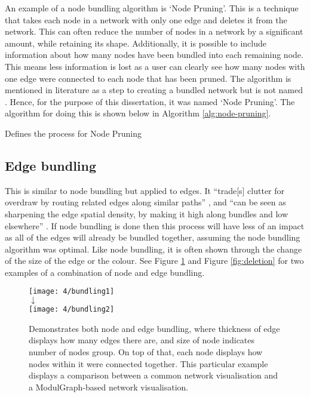 \documentclass[../dissertation.tex]{subfiles}
\begin{document}
An example of a node bundling algorithm is `Node Pruning'. This is a technique that takes each node in a network with only one edge and deletes it from the network. This can often reduce the number of nodes in a network by a significant amount, while retaining its shape. Additionally, it is possible to include information about how many nodes have been bundled into each remaining node. This means less information is lost as a user can clearly see how many nodes with one edge were connected to each node that has been pruned. The algorithm is mentioned in literature as a step to creating a bundled network but is not named \cite{brandes2003experiments}. Hence, for the purpose of this dissertation, it was named `Node Pruning'. The algorithm for doing this is shown below in Algorithm \ref{alg:node-pruning}.

\begin{algorithm}
\caption{Defines the process for Node Pruning}
\label{alg:node-pruning}
\begin{algorithmic}
 
   \ENDIF \ENDFOR
{}  \ENDFOR
\end{algorithmic}
\end{algorithm}

\subsection{Edge bundling}
\label{sec:edge_bundling}

This is similar to node bundling but applied to edges. It ``trade[s] clutter for overdraw by routing related edges along similar paths'' \cite{hurter2012graph}, and ``can be seen as sharpening the edge spatial density, by making it high along bundles and low elsewhere'' \cite{hurter2012graph}. If node bundling is done then this process will have less of an impact as all of the edges will already be bundled together, assuming the node bundling algorithm was optimal. Like node bundling, it is often shown through the change of the size of the edge or the colour. See Figure \ref{fig:bundling} and Figure \ref{fig:deletion} for two examples of a combination of node and edge bundling.
\begin{figure}
    \centering
    \texttt{[image: 4/bundling1]}
    \\$\downarrow$\\
    \texttt{[image: 4/bundling2]}
    \caption{Demonstrates both node and edge bundling, where thickness of edge displays how many edges there are, and size of node indicates number of nodes group. On top of that, each node displays how nodes within it were connected together. This particular example displays a comparison between a common network visualisation and a ModulGraph-based network visualisation. \cite{li2015modulgraph}}
    \label{fig:bundling}
\end{figure}
\end{document}
